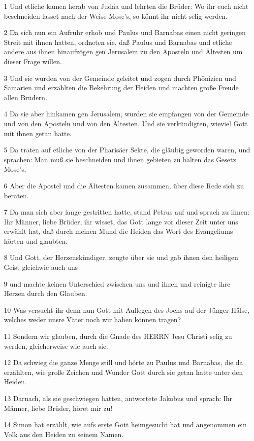 \par 1 Und etliche kamen herab von Judäa und lehrten die Brüder: Wo ihr euch nicht beschneiden lasset nach der Weise Mose's, so könnt ihr nicht selig werden.
\par 2 Da sich nun ein Aufruhr erhob und Paulus und Barnabas einen nicht geringen Streit mit ihnen hatten, ordneten sie, daß Paulus und Barnabas und etliche andere aus ihnen hinaufzögen gen Jerusalem zu den Aposteln und Ältesten um dieser Frage willen.
\par 3 Und sie wurden von der Gemeinde geleitet und zogen durch Phönizien und Samarien und erzählten die Bekehrung der Heiden und machten große Freude allen Brüdern.
\par 4 Da sie aber hinkamen gen Jerusalem, wurden sie empfangen von der Gemeinde und von den Aposteln und von den Ältesten. Und sie verkündigten, wieviel Gott mit ihnen getan hatte.
\par 5 Da traten auf etliche von der Pharisäer Sekte, die gläubig geworden waren, und sprachen: Man muß sie beschneiden und ihnen gebieten zu halten das Gesetz Mose's.
\par 6 Aber die Apostel und die Ältesten kamen zusammen, über diese Rede sich zu beraten.
\par 7 Da man sich aber lange gestritten hatte, stand Petrus auf und sprach zu ihnen: Ihr Männer, liebe Brüder, ihr wisset, das Gott lange vor dieser Zeit unter uns erwählt hat, daß durch meinen Mund die Heiden das Wort des Evangeliums hörten und glaubten.
\par 8 Und Gott, der Herzenskündiger, zeugte über sie und gab ihnen den heiligen Geist gleichwie auch uns
\par 9 und machte keinen Unterschied zwischen uns und ihnen und reinigte ihre Herzen durch den Glauben.
\par 10 Was versucht ihr denn nun Gott mit Auflegen des Jochs auf der Jünger Hälse, welches weder unsre Väter noch wir haben können tragen?
\par 11 Sondern wir glauben, durch die Gnade des HERRN Jesu Christi selig zu werden, gleicherweise wie auch sie.
\par 12 Da schwieg die ganze Menge still und hörte zu Paulus und Barnabas, die da erzählten, wie große Zeichen und Wunder Gott durch sie getan hatte unter den Heiden.
\par 13 Darnach, als sie geschwiegen hatten, antwortete Jakobus und sprach: Ihr Männer, liebe Brüder, höret mir zu!
\par 14 Simon hat erzählt, wie aufs erste Gott heimgesucht hat und angenommen ein Volk aus den Heiden zu seinem Namen.
